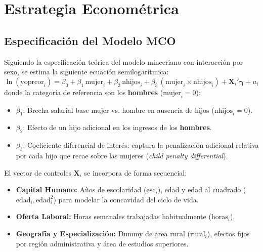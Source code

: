 \documentclass[11pt,a4paper]{article}
\begin{document}
\section{Estrategia Econométrica}
\subsection{Especificación del Modelo MCO}
Siguiendo la especificación teórica del modelo minceriano con interacción por sexo, se estima la siguiente ecuación semilogarítmica:
\begin{equation}
    \ln(\text{yoprcor}_i) = \beta_0 + \beta_1\,\text{mujer}_i + \beta_2\,\text{nhijos}_i + \beta_3\,(\text{mujer}_i \times \text{nhijos}_i) + \mathbf{X}_i'\boldsymbol{\gamma} + u_i
    \label{eq:mco_base_hombre}
\end{equation}
donde la categoría de referencia son los \textbf{hombres} ($\text{mujer}_i = 0$):
\begin{itemize}
    \item $\beta_1$: Brecha salarial base mujer vs. hombre en ausencia de hijos ($\text{nhijos}_i = 0$).
    \item $\beta_2$: Efecto de un hijo adicional en los ingresos de los \textbf{hombres}.
    \item $\beta_3$: Coeficiente diferencial de interés: captura la penalización adicional relativa por cada hijo que recae sobre las mujeres (\textit{child penalty differential}).
\end{itemize}

El vector de controles $\mathbf{X}_i$ se incorpora de forma secuencial:
\begin{itemize}
    \item \textbf{Capital Humano:} Años de escolaridad ($\text{esc}_i$), edad y edad al cuadrado ($\text{edad}_i, \text{edad}_i^2$) para modelar la concavidad del ciclo de vida.
    \item \textbf{Oferta Laboral:} Horas semanales trabajadas habitualmente ($\text{horas}_i$).
    \item \textbf{Geografía y Especialización:} Dummy de área rural ($\text{rural}_i$), efectos fijos por región administrativa y área de estudios superiores.
\end{itemize}
\end{document}
